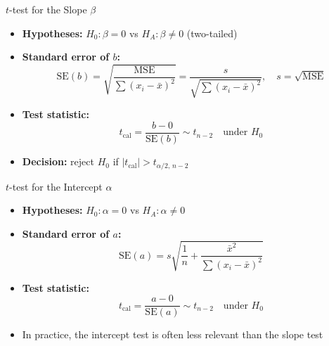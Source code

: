 \documentclass[12pt, aspectratio=169]{beamer}
\begin{document}
    \begin{frame}{$t$-test for the Slope $\beta$}
        \begin{itemize}
            \item \textbf{Hypotheses:} \quad $H_0: \beta = 0$ \; vs \;
                $H_A: \beta \neq 0$ \quad (two-tailed)
            \item \textbf{Standard error of $b$:}
                \[
                    \mathrm{SE}(b) = \sqrt{\frac{\text{MSE}}{\sum(x_i - \bar{x})^2}}
                    = \frac{s}{\sqrt{\sum(x_i-\bar{x})^2}},
                    \quad s = \sqrt{\text{MSE}}
                \]
            \item \textbf{Test statistic:}
                \[
                    t_{\text{cal}} = \frac{b - 0}{\mathrm{SE}(b)} \sim t_{n-2}
                    \quad \text{under } H_0
                \]
            \item \textbf{Decision:} reject $H_0$ if $|t_{\text{cal}}| > t_{\alpha/2,\,n-2}$
        \end{itemize}
    \end{frame}


    \begin{frame}{$t$-test for the Intercept $\alpha$}
        \begin{itemize}
            \item \textbf{Hypotheses:} \quad $H_0: \alpha = 0$ \; vs \;
                $H_A: \alpha \neq 0$
            \item \textbf{Standard error of $a$:}
                \[
                    \mathrm{SE}(a) = s\sqrt{\frac{1}{n} + \frac{\bar{x}^2}{\sum(x_i - \bar{x})^2}}
                \]
            \item \textbf{Test statistic:}
                \[
                    t_{\text{cal}} = \frac{a - 0}{\mathrm{SE}(a)} \sim t_{n-2}
                    \quad \text{under } H_0
                \]
            \item In practice, the intercept test is often less relevant than the slope test
        \end{itemize}
    \end{frame}
\end{document}
